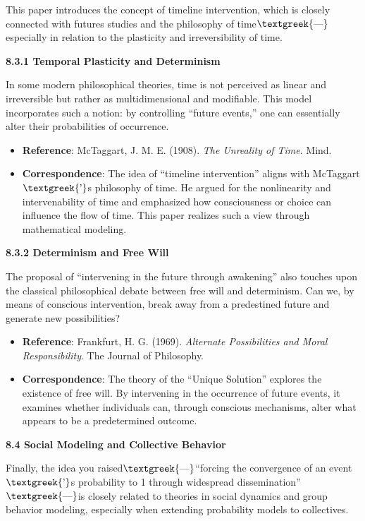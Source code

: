 \documentclass[a4paper]{article}
\begin{document}
This paper introduces the concept of timeline intervention, which is closely connected with futures studies and the
philosophy of time$\text{\textgreek{—}}$especially in relation to the plasticity and irreversibility of time.

\textbf{8.3.1 Temporal Plasticity and Determinism}

In some modern philosophical theories, time is not perceived as linear and irreversible but rather as multidimensional
and modifiable. This model incorporates such a notion: by controlling “future events,” one can essentially alter their
probabilities of occurrence.

\begin{itemize}[series=listWWNumxxiv,label=[F0B7?]]
\item \textbf{Reference}: McTaggart, J. M. E. (1908). \textit{The Unreality of Time}. Mind.
\item \textbf{Correspondence}: The idea of “timeline intervention” aligns with McTaggart$\text{\textgreek{’}}$s
philosophy of time. He argued for the nonlinearity and intervenability of time and emphasized how consciousness or
choice can influence the flow of time. This paper realizes such a view through mathematical modeling.
\end{itemize}
\textbf{8.3.2 Determinism and Free Will}

The proposal of “intervening in the future through awakening” also touches upon the classical philosophical debate
between free will and determinism. Can we, by means of conscious intervention, break away from a predestined future and
generate new possibilities?

\begin{itemize}[series=listWWNumxxv,label=[F0B7?]]
\item \textbf{Reference}: Frankfurt, H. G. (1969). \textit{Alternate Possibilities and Moral Responsibility}. The
Journal of Philosophy.
\item \textbf{Correspondence}: The theory of the “Unique Solution” explores the existence of free will. By intervening
in the occurrence of future events, it examines whether individuals can, through conscious mechanisms, alter what
appears to be a predetermined outcome.
\end{itemize}
\textbf{8.4 Social Modeling and Collective Behavior}

Finally, the idea you raised$\text{\textgreek{—}}$“forcing the convergence of an event$\text{\textgreek{’}}$s
probability to 1 through widespread dissemination”$\text{\textgreek{—}}$is closely related to theories in social
dynamics and group behavior modeling, especially when extending probability models to collectives.
\end{document}
